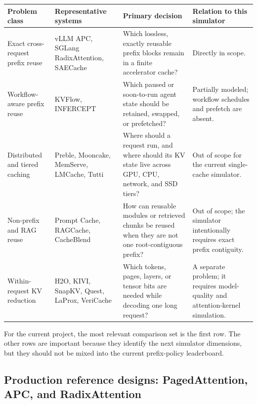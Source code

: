 \documentclass[11pt]{article}
\begin{document}
\begin{longtable}{>{\raggedright\arraybackslash}p{}
                  >{\raggedright\arraybackslash}p{}
                  >{\raggedright\arraybackslash}p{}
                  >{\raggedright\arraybackslash}p{}}
\toprule
\textbf{Problem class} & \textbf{Representative systems} & \textbf{Primary decision}
& \textbf{Relation to this simulator} \\
\midrule
\endhead
Exact cross-request prefix reuse &
vLLM APC, SGLang RadixAttention, SAECache \cite{vllm-apc,sglang,saecache} &
Which lossless, exactly reusable prefix blocks remain in a finite accelerator cache? &
Directly in scope. \\
Workflow-aware prefix reuse &
KVFlow, INFERCEPT \cite{kvflow,infercept} &
Which paused or soon-to-run agent state should be retained, swapped, or prefetched? &
Partially modeled; workflow schedules and prefetch are absent. \\
Distributed and tiered caching &
Preble, Mooncake, MemServe, LMCache, Tutti
\cite{preble,mooncake,memserve,lmcache,tutti} &
Where should a request run, and where should its KV state live across GPU, CPU, network,
and SSD tiers? &
Out of scope for the current single-cache simulator. \\
Non-prefix and RAG reuse &
Prompt Cache, RAGCache, CacheBlend \cite{promptcache,ragcache,cacheblend} &
How can reusable modules or retrieved chunks be reused when they are not one
root-contiguous prefix? &
Out of scope; the simulator intentionally requires exact prefix contiguity. \\
Within-request KV reduction &
H2O, KIVI, SnapKV, Quest, LaProx, VeriCache
\cite{h2o,kivi,snapkv,quest,laprox,vericache} &
Which tokens, pages, layers, or tensor bits are needed while decoding one long request? &
A separate problem; it requires model-quality and attention-kernel simulation. \\
\bottomrule
\end{longtable}

For the current project, the most relevant comparison set is the first row.  The other
rows are important because they identify the next simulator dimensions, but they should
not be mixed into the current prefix-policy leaderboard.

\subsection{Production reference designs: PagedAttention, APC, and RadixAttention}
\end{document}
